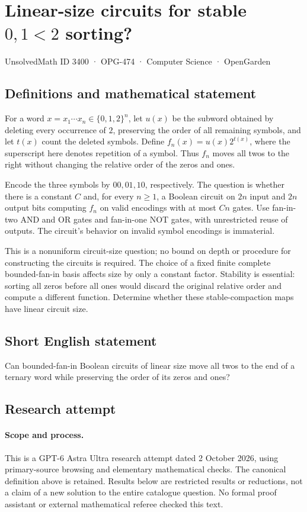 \documentclass[11pt,a4paper]{article}
\begin{document}
\section*{Linear-size circuits for stable $0,1 < 2$ sorting?}\label{3400}
{\small UnsolvedMath ID 3400 · OPG-474 · Computer Science · OpenGarden}
\subsection{Definitions and mathematical statement}
For a word $x=x_1\cdots x_n\in\{0,1,2\}^n$, let $u(x)$ be the
subword obtained by deleting every occurrence of $2$, preserving
the order of all remaining symbols, and let $t(x)$ count the deleted
symbols. Define $f_n(x)=u(x)2^{t(x)}$, where the superscript here
denotes repetition of a symbol. Thus $f_n$ moves all twos to the
right without changing the relative order of the zeros and ones.

Encode the three symbols by $00,01,10$, respectively. The question
is whether there is a constant $C$ and, for every $n\ge1$, a Boolean
circuit on $2n$ input and $2n$ output bits computing $f_n$ on valid
encodings with at most $Cn$ gates. Use fan-in-two AND and OR gates
and fan-in-one NOT gates, with unrestricted reuse of outputs.
The circuit's behavior on invalid symbol encodings is immaterial.

This is a nonuniform circuit-size question; no bound on depth or
procedure for constructing the circuits is required. The choice of
a fixed finite complete bounded-fan-in basis affects size by only
a constant factor. Stability is essential: sorting all zeros before
all ones would discard the original relative order and compute a
different function. Determine whether these stable-compaction maps
have linear circuit size.
\subsection{Short English statement}
Can bounded-fan-in Boolean circuits of linear size move all twos to the end of a ternary word while preserving the order of its zeros and ones?
\subsection{Research attempt}
\paragraph{Scope and process.}
This is a GPT-6 Astra Ultra research attempt dated 2 October 2026, using
primary-source browsing and elementary mathematical checks. The canonical
definition above is retained. Results below are restricted results or
reductions, not a claim of a new solution to the entire catalogue question.
No formal proof assistant or external mathematical referee checked this text.
\end{document}
